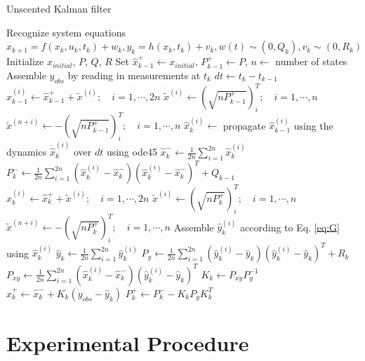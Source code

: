 \documentclass[letterpaper, preprint, paper,11pt]{AAS}	%
\begin{document}
\begin{algorithm}[H]
\footnotesize
\caption{Unscented Kalman filter}
\label{alg:UKF}
\begin{algorithmic}[1]
\State Recognize system equations $x_{k+1}=f(x_k,u_k,t_k)+w_k, y_k=h(x_k,t_k)+v_k, w(t)\sim(0,Q_k), v_k\sim(0,R_k)$
\State Initialize $x_{initial}$, $P$, $Q$, $R$
\State Set $\hat{x}_{k-1}^+ \gets x_{initial}$, $P_{k-1}^+ \gets P$, $n \gets$ number of states
    \State Assemble $y_{obs}$ by reading in measurements at $t_k$
    \State $dt \gets t_k - t_{k-1}$
    		\State $\hat{x}_{k-1}^{(i)} \gets \hat{x}_{k-1}^+ + \tilde{x}^{(i)}; \quad i=1,\cdots,2n$
    		\State $\tilde{x}^{(i)} \gets (\sqrt{nP_{k-1}^+})_i^T; \quad i=1,\cdots,n$
    		\State $\tilde{x}^{(n+i)} \gets -(\sqrt{nP_{k-1}^+})_i^T; \quad i=1,\cdots,n$
    	\EndFor
    \State $\hat{x}_k^{(i)} \gets$ propagate $\hat{x}_{k-1}^{(i)}$ using the dynamics $\dot{\hat{x}}_k^{(i)}$ over $dt$ using ode45
    \State $\hat{x}_k^- \gets \frac{1}{2n}\sum_{i=1}^{2n}\hat{x}_k^{(i)}$
    \State $P_k^- \gets \frac{1}{2n}\sum_{i=1}^{2n}(\hat{x}_k^{(i)}-\hat{x}_k^-)(\hat{x}_k^{(i)}-\hat{x}_k^-)^T + Q_{k-1}$
    		\State $\hat{x}_{k}^{(i)} \gets \hat{x}_{k}^+ + \tilde{x}^{(i)}; \quad i=1,\cdots,2n$
    		\State $\tilde{x}^{(i)} \gets (\sqrt{nP_{k}^+})_i^T; \quad i=1,\cdots,n$
    		\State $\tilde{x}^{(n+i)} \gets -(\sqrt{nP_{k}^+})_i^T; \quad i=1,\cdots,n$
    	\EndFor
    \State Assemble $\hat{y}_{k}^{(i)}$ according to Eq. \ref{eq:G} using $\hat{x}_k^{(i)}$
    \State $\hat{y}_k \gets \frac{1}{2n}\sum_{i=1}^{2n}\hat{y}_k^{(i)}$
    \State $P_y \gets \frac{1}{2n}\sum_{i=1}^{2n}(\hat{y}_k^{(i)}-\hat{y}_k)(\hat{y}_k^{(i)}-\hat{y}_k)^T + R_k$
    \State $P_{xy} \gets \frac{1}{2n}\sum_{i=1}^{2n}(\hat{x}_k^{(i)}-\hat{x}_k^-)(\hat{y}_k^{(i)}-\hat{y}_k)^T$
    \State $K_k \gets P_{xy}P_y^{-1}$
    \State $\hat{x}_k^+ \gets \hat{x}_k^- + K_k(y_{obs}-\hat{y}_k)$
    \State $P_k^+ \gets P_k^- - K_kP_yK_k^T$
\EndFor
\end{algorithmic}
\end{algorithm}

\section{Experimental Procedure}
\end{document}
